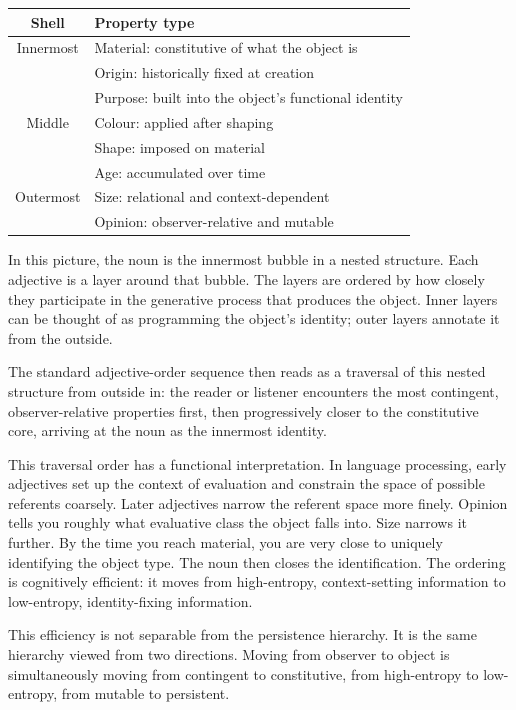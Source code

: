 \documentclass[11pt]{article}
\theoremstyle{rthm}
\theoremstyle{rdef}
\theoremstyle{remark}
\begin{document}
\medskip
\begin{center}
\begin{tabular}{cl}
\toprule
\textbf{Shell} & \textbf{Property type} \\
\midrule
Innermost & Material: constitutive of what the object is \\
& Origin: historically fixed at creation \\
& Purpose: built into the object's functional identity \\
\midrule
Middle & Colour: applied after shaping \\
& Shape: imposed on material \\
& Age: accumulated over time \\
\midrule
Outermost & Size: relational and context-dependent \\
& Opinion: observer-relative and mutable \\
\bottomrule
\end{tabular}
\end{center}
\medskip

In this picture, the noun is the innermost bubble in a nested structure.
Each adjective is a layer around that bubble. The layers are ordered by
how closely they participate in the generative process that produces the
object. Inner layers can be thought of as programming the object's
identity; outer layers annotate it from the outside.

The standard adjective-order sequence then reads as a traversal of this
nested structure from outside in: the reader or listener encounters the
most contingent, observer-relative properties first, then progressively
closer to the constitutive core, arriving at the noun as the innermost
identity.

This traversal order has a functional interpretation. In language processing,
early adjectives set up the context of evaluation and constrain the space
of possible referents coarsely. Later adjectives narrow the referent space
more finely. Opinion tells you roughly what evaluative class the object
falls into. Size narrows it further. By the time you reach material, you
are very close to uniquely identifying the object type. The noun then
closes the identification. The ordering is cognitively efficient: it
moves from high-entropy, context-setting information to low-entropy,
identity-fixing information.

This efficiency is not separable from the persistence hierarchy. It is
the same hierarchy viewed from two directions. Moving from observer to
object is simultaneously moving from contingent to constitutive, from
high-entropy to low-entropy, from mutable to persistent.
\end{document}
